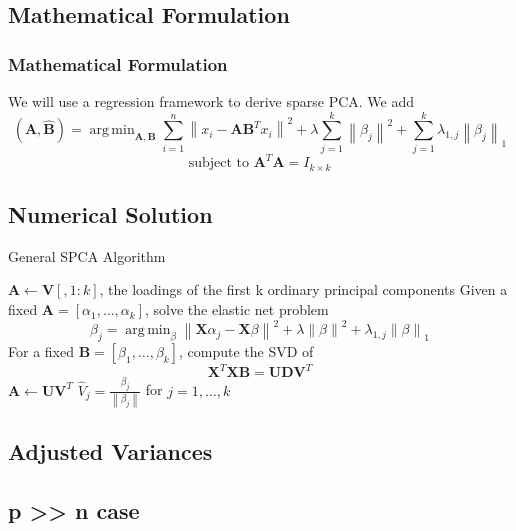 \documentclass{beamer}
\theoremstyle{plain}
\theoremstyle{definition}
\newcommand{\mat}[1]{\mathbf{#1}}
\DeclareMathOperator*{\argmin}{arg\,min}
\newcommand{\norm}[1]{\left\lVert #1 \right\rVert}
\begin{document}
\subsection{Mathematical Formulation}
\begin{frame}
\frametitle{Mathematical Formulation}
We will use a regression framework to derive sparse PCA. We add
$$(\hat{\mat{A}}, \hat{\mat{B}}) = \argmin_{\mat{A}, \mat{B}} \sum_{i=1}^{n} \norm{x_i - \mat{A}\mat{B}^Tx_i}^2 + \lambda \sum_{j=1}^{k}\norm{\beta_j}^2 + \sum_{j=1}^k \lambda_{1,j} \norm{\beta_j}_1$$
$$\text{subject to } \mat{A}^T\mat{A} = I_{k \times k}$$
\end{frame}

\subsection{Numerical Solution}

\begin{frame}
\begin{algorithm}[H]
  \scriptsize
    \caption{General SPCA Algorithm}
    \begin{algorithmic}[1]
        	\State $\mat A \gets \mat V[,1 \colon k]$, the loadings of the first k ordinary principal components
             
                \State Given a fixed $\mat A = [\alpha_1, \ldots, \alpha_k]$, solve the elastic net problem $$\beta_j = \argmin_{\beta} \norm{\mat X \alpha_j - \mat X \beta}^{2} + \lambda \norm{\beta}^2 + \lambda_{1,j}\norm{\beta}_{1}$$
                \State For a fixed $\mat B = [\beta_1, \ldots, \beta_k]$, compute the SVD of $$\mat X^T \mat X \mat B = \mat U \mat D \mat V^T$$
                \State $\mat A \gets \mat U \mat V^T$
            \EndWhile
            \State $\hat{V}_j = \frac{\beta_j}{\norm{\beta_j}}$ for $j = 1, \ldots, k$
        \EndProcedure
    \end{algorithmic}
\end{algorithm} 
\end{frame}

\subsection{Adjusted Variances}
\subsection{p >> n case}

\end{document}
